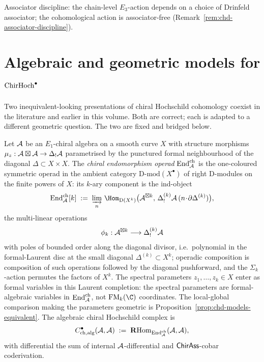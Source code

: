 Associator discipline: the chain-level $E_3$-action depends on a
choice of Drinfeld associator; the cohomological action is
associator-free (Remark~\ref{rem:chd-associator-discipline}).

\section{Algebraic and geometric models for $\mathrm{ChirHoch}^\bullet$}
\label{sec:chd-setup}

Two inequivalent-looking presentations of chiral Hochschild
cohomology coexist in the literature and earlier in this volume.
Both are correct; each is adapted to a different geometric
question. The two are fixed and bridged below.

\begin{definition}%
\label{def:chd-alg}%
%
Let $\mathcal{A}$ be an $E_1$-chiral algebra on a smooth curve $X$ with
structure morphisms $\mu_z : \mathcal{A} \boxtimes \mathcal{A} \to \Delta_! \mathcal{A}$
parametrised by the punctured formal neighbourhood of the diagonal
$\Delta \subset X\times X$. The \emph{chiral endomorphism operad}
$\mathrm{End}^{\mathrm{ch}}_{\mathcal{A}}$ is the one-coloured symmetric operad in
the ambient category $\mathrm{D}\text{-}\mathrm{mod}(X^\bullet)$ of
right D-modules on the finite powers of $X$: its $k$-ary component
is the ind-object
\[
\End^{\mathrm{ch}}_{\cA}[k] \;:=\;
\varinjlim_{n}\,
\Hom_{\mathrm{D}(X^k)}\bigl(\cA^{\boxtimes k},\,
\Delta^{(k)}_! \cA\,(n\!\cdot\!\partial\Delta^{(k)})\bigr),
\]
the multi-linear operations
\[
\phi_k : \mathcal{A}^{\boxtimes k} \longrightarrow \Delta^{(k)}_! \mathcal{A}
\]
with poles of bounded order along the diagonal divisor, i.e.\
polynomial in the formal-Laurent disc at the small diagonal
$\Delta^{(k)} \subset X^k$; operadic composition is composition of
such operations followed by the diagonal pushforward, and the
$\Sigma_k$-action permutes the factors of $X^k$. The spectral parameters
$z_1, \ldots, z_k \in X$ enter as formal variables in this
Laurent completion: the spectral parameters are formal-algebraic
variables in $\mathrm{End}^{\mathrm{ch}}_{\mathcal{A}}$, not $\FM_k(\C)$ coordinates.
The local-global comparison making the parameters geometric is
Proposition~\ref{prop:chd-models-equivalent}.
The algebraic chiral Hochschild complex is
\begin{equation}\label{eq:chd-alg-def}
 C^\bullet_{\mathrm{ch,alg}}(\mathcal{A}, \mathcal{A}) \;:=\;
 \mathbf{R}\mathrm{Hom}_{\mathrm{End}^{\mathrm{ch}}_{\mathcal{A}}}(\mathcal{A}, \mathcal{A}),
\end{equation}
with differential the sum of internal $\mathcal{A}$-differential and
$\mathsf{ChirAss}$-cobar coderivation.
\end{definition}

